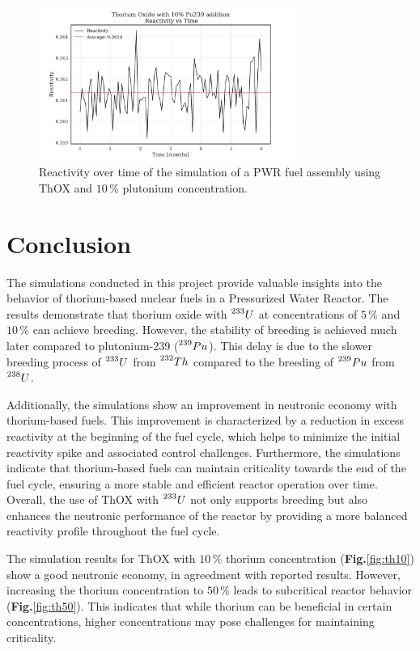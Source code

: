 \begin{figure}[ht]
    \centering
    \includegraphics[width=0.75\textwidth, scale = 0.5]{Kap7/Figures_Kap7/Reactivity_vs_Time_ThOX_Pu10.pdf}
    \caption{Reactivity over time of the simulation of a PWR fuel assembly using ThOX and \(10 \, \%\) plutonium concentration.}
    \label{fig:p_th_pu}
\end{figure}

\section{Conclusion}
The simulations conducted in this project provide valuable insights into the behavior of thorium-based nuclear fuels in a Pressurized Water Reactor. The results demonstrate that thorium oxide with \(\prescript{233}{}{U}\) at concentrations of \(5 \, \%\) and \(10 \, \%\) can achieve breeding. However, the stability of breeding is achieved much later compared to plutonium-239 (\(\prescript{239}{}{Pu}\)). This delay is due to the slower breeding process of \(\prescript{233}{}{U}\) from \(\prescript{232}{}{Th}\) compared to the breeding of \(\prescript{239}{}{Pu}\) from \(\prescript{238}{}{U}\).

Additionally, the simulations show an improvement in neutronic economy with thorium-based fuels. This improvement is characterized by a reduction in excess reactivity at the beginning of the fuel cycle, which helps to minimize the initial reactivity spike and associated control challenges. Furthermore, the simulations indicate that thorium-based fuels can maintain criticality towards the end of the fuel cycle, ensuring a more stable and efficient reactor operation over time. Overall, the use of ThOX with \(\prescript{233}{}{U}\) not only supports breeding but also enhances the neutronic performance of the reactor by providing a more balanced reactivity profile throughout the fuel cycle.

The simulation results for ThOX with \(10 \, \%\) thorium concentration (\textbf{Fig.}\ref{fig:th10}) show a good neutronic economy, in agreedment with reported results. However, increasing the thorium concentration to \(50 \, \%\) leads to subcritical reactor behavior (\textbf{Fig.}\ref{fig:th50}). This indicates that while thorium can be beneficial in certain concentrations, higher concentrations may pose challenges for maintaining criticality.

